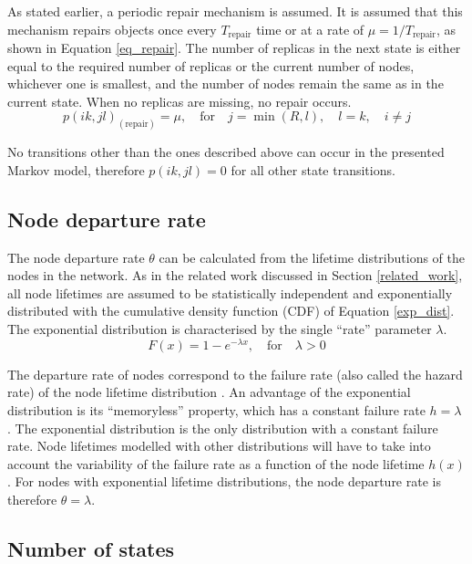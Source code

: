 \documentclass[10pt,a4paper,conference]{IEEEtran}
\begin{document}
As stated earlier, a periodic repair mechanism is assumed. It is assumed that this mechanism repairs objects once every $T_{\textrm{repair}}$ time or at a rate of $\mu = 1/T_{\textrm{repair}}$, as shown in Equation \ref{eq_repair}. The number of replicas in the next state is either equal to the required number of replicas or the current number of nodes, whichever one is smallest, and the number of nodes remain the same as in the current state. When no replicas are missing, no repair occurs.
%
\begin{equation} \label{eq_repair}
    p(i k,j l)_{(\textrm{repair})} = \mu,\quad\textrm{for}\quad j = \min(R, l),\quad l = k,\quad i \neq j
\end{equation}

No transitions other than the ones described above can occur in the presented Markov model, therefore $p(i k,j l) = 0$ for all other state transitions.

\subsection{Node departure rate}

The node departure rate $\theta$ can be calculated from the lifetime distributions of the nodes in the network. As in the related work discussed in Section \ref{related_work}, all node lifetimes are assumed to be statistically independent and exponentially distributed with the cumulative density function (CDF) of Equation \eqref{exp_dist}. The exponential distribution is characterised by the single ``rate'' parameter $\lambda$.
%
\begin{equation} \label{exp_dist}
    F(x) = 1 - e^{-\lambda x},\quad\textrm{for}\quad \lambda > 0
\end{equation}

The departure rate of nodes correspond to the failure rate (also called the hazard rate) of the node lifetime distribution \cite{rausand2004systemreliability}. An advantage of the exponential distribution is its ``memoryless'' property, which has a constant failure rate $h = \lambda$ \cite{rausand2004systemreliability}. The exponential distribution is the only distribution with a constant failure rate. Node lifetimes modelled with other distributions will have to take into account the variability of the failure rate as a function of the node lifetime $h(x)$. For nodes with exponential lifetime distributions, the node departure rate is therefore $\theta = \lambda$.

\subsection{Number of states}
\end{document}
